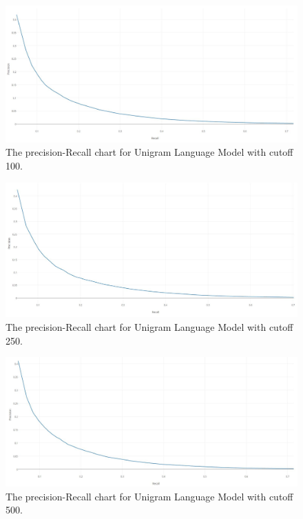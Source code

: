 \begin{figure}[H]
	\centering
	\includegraphics[width=130mm]{images/uniresult100.jpg}
	\caption{The precision-Recall chart for Unigram Language Model with cutoff 100.}
	\label{fig:uniresult100}
\end{figure}

\begin{figure}[H]
	\centering
	\includegraphics[width=130mm]{images/uniresult250.jpg}
	\caption{The precision-Recall chart for Unigram Language Model with cutoff 250.}
	\label{fig:uniresult250}
\end{figure}

\begin{figure}[H]
	\centering
	\includegraphics[width=130mm]{images/uniresult500.jpg}
	\caption{The precision-Recall chart for Unigram Language Model with cutoff 500.}
	\label{fig:uniresult500}
\end{figure}

